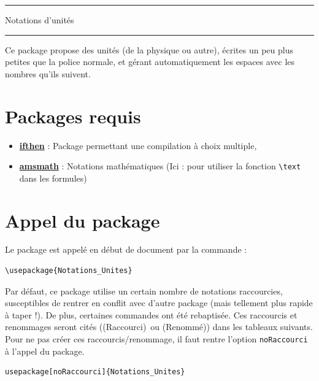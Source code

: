 \documentclass[a4paper,12pt]{article}
\newcommand{\rac}{({\color{red}Raccourci})}
\newcommand{\ren}{({\color{blue}Renommé})}
\begin{document}
	\begin{center}
		\hrule{\Large Notations d'unités}\\\hrule
	\end{center}

	
	Ce package propose des unités (de la physique ou autre),
	écrites un peu plus petites que la police normale,
	et gérant automatiquement les espaces avec les nombres qu'ils suivent.
	
	\tableofcontents
	
	
	
	\section{Packages requis}

	\begin{itemize}
		\item \href{http://www.ctan.org/pkg/ifthen}{\textbf{ifthen}} : Package permettant une compilation à choix multiple,
		\item \href{http://www.ams.org/publications/authors/tex/amslatex}{\textbf{amsmath}} : Notations mathématiques (Ici : pour utiliser la fonction \verb!\text! dans les formules)
	\end{itemize}

	\section{Appel du package}

	Le package est appelé en début de document par la commande :
	\begin{verbatim}
\usepackage{Notations_Unites}
	\end{verbatim}

	Par défaut, ce package utilise un certain nombre de notations raccourcies, susceptibles de rentrer en conflit avec d'autre package (mais tellement plus rapide à taper !).
	De plus, certaines commandes ont été rebaptisée.
	Ces raccourcis et renommages seront cités (\rac\ ou \ren) dans les tableaux suivants.
	Pour ne pas créer ces raccourcis/renommage, il faut rentre l'option \verb!noRaccourci! à l'appel du package.

	\begin{verbatim}
usepackage[noRaccourci]{Notations_Unites}
	\end{verbatim}


	
\end{document}
